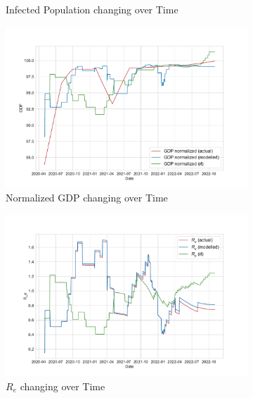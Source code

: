 \documentclass[tikz,fleqn,12pt]{wlscirep}
\begin{document}
\begin{figure}[htbp!]
\begin{subfigure}[t]{0.48\textwidth}
    \caption{Infected Population changing over Time}
    \label{fig:175975_rl_i}
  \end{subfigure}
  \hfill
  \begin{subfigure}[t]{0.48\textwidth}
    \centering
    \includegraphics[width=\linewidth]{images/175975/rl_gdp.pdf}
    \caption{Normalized GDP changing over Time}
    \label{fig:175975_rl_gdp}
  \end{subfigure}
  \hfill
  \begin{subfigure}[t]{0.48\textwidth}
    \centering
    \includegraphics[width=\linewidth]{images/175975/rl_r_eff.pdf}
    \caption{$R_e$ changing over Time}
    \label{fig:175975_rl_r_eff}
  \end{subfigure}
  \hfill
  \begin{subfigure}[t]{0.48\textwidth}
    \centering

\end{subfigure}
\end{figure}
\end{document}
